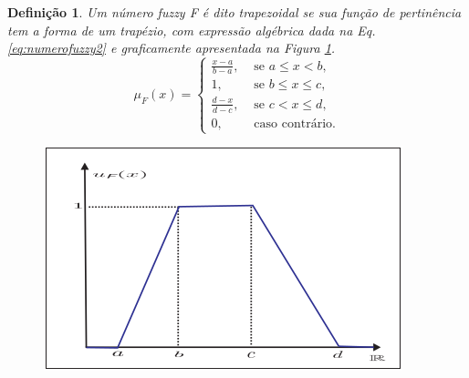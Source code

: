 \documentclass[tcc,capa]{texufpel}
\newtheorem{Def}{Defini\c c\~ao}
\begin{document}
\begin{Def}
Um número fuzzy F é dito trapezoidal se sua função de pertinência tem a forma de um trapézio, com expressão algébrica dada na Eq.\ref{eq:numerofuzzy2} e graficamente apresentada na Figura \ref{fig:NFuzzyTrapeziodal}.
\begin{equation}\label{eq:numerofuzzy2}
 \mu_{F}(x)=
  \left \{
   \begin{array}{ll}
  \frac{x-a}{b-a},  & \mbox{ se $a \leq x < b,$} \\
  1, & \mbox{ se $b \leq x \leq c,$} \\
  \frac{d-x}{d-c}, & \mbox{ se $c < x \leq d,$} \\
  0, & \mbox{ caso contrário.}
   \end{array}
  \right.
\end{equation}
\begin{figure}[ht]
\centering
\includegraphics[scale=0.5]{images/numero_fuzzy_trapezoidal.png}
\label{fig:NFuzzyTrapeziodal}
\end{figure}
\end{Def}
\end{document}
